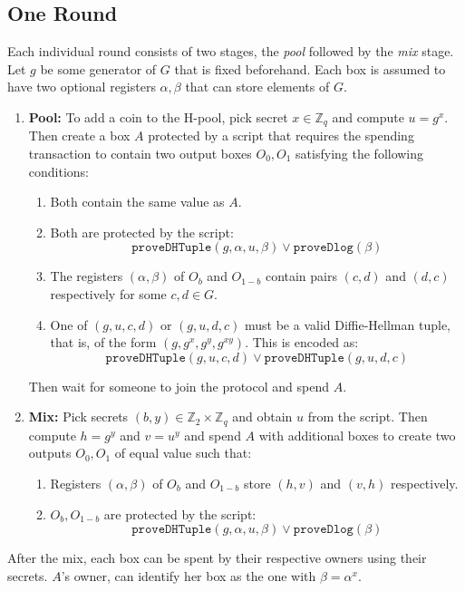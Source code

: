 \documentclass[runningheads]{llncs}
\newcommand{\langname}{ErgoScript\xspace}
\begin{document}
\subsection{One \algname Round}
Each individual \algname round consists of two stages, the {\em pool} followed by the {\em mix} stage. 
Let $g$ be some generator of $G$ that is fixed beforehand. Each box is assumed to have two optional registers $\alpha, \beta$ that can store elements of $G$.

\begin{enumerate}
	\item \textbf{Pool:} To add a coin to the H-pool, pick secret $x\in \mathbb{Z}_q$ and compute $u = g^x$. Then create a box $A$ protected by a script that requires the spending transaction to contain two output boxes $O_0, O_1$ satisfying the following conditions: 
	\begin{enumerate}
		\item Both contain the same value as $A$.
		\item Both are protected by the script: $$\texttt{proveDHTuple}(g, \alpha, u, \beta) \lor \texttt{proveDlog}(\beta)$$
        \item The registers $(\alpha, \beta)$ of $O_b$ and $O_{1-b}$ contain pairs $(c, d)$ and $(d, c)$ respectively for some $c, d\in G$. 
		\item One of $(g, u, c, d)$ or $(g, u, d, c)$ must be a valid Diffie-Hellman tuple, that is, of the form $(g, g^x, g^y, g^{xy})$. This is encoded %
		as: $$\texttt{proveDHTuple}(g, u, c, d)\lor \texttt{proveDHTuple}(g, u, d, c)$$
	\end{enumerate}
	Then wait for someone to join the protocol and spend $A$.

	\item \textbf{Mix:} Pick secrets $(b, y) \in \mathbb{Z}_2\times \mathbb{Z}_q$ and obtain $u$ from the script. Then compute $h= g^y$ and $v = u^y$ and spend $A$ with additional boxes to create two outputs $O_0, O_1$ of equal value such that:
	\begin{enumerate}
		\item Registers $(\alpha, \beta)$ of $O_b$ and $O_{1-b}$ store $(h, v)$ and $(v, h)$ respectively. 
		\item $O_b, O_{1-b}$ are protected by the script: $$\texttt{proveDHTuple}(g, \alpha, u, \beta)\lor \texttt{proveDlog}(\beta)$$
	\end{enumerate}
\end{enumerate}
After the mix, each box can be spent by their respective owners using their secrets. 
$A$'s owner, can identify her box as the one with $\beta = \alpha^x$. 
\end{document}
